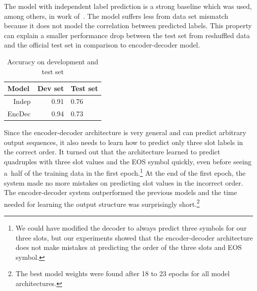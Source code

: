 \documentclass{itatnew}
\def\OD#1{{\color{darkgreen}OD: \it #1}}
\begin{document}
The model with independent label prediction is a strong baseline which was used, among others, in work of~\cite{zilka2015incremental}.
The model suffers less from data set mismatch because it does not model the correlation between predicted labels.
This property can explain a smaller performance drop between the test set from reshuffled data and the official test set in comparison to encoder-decoder model.

\begin{table}
\begin{center}
\begin{tabular}{r@{\quad}rll}
\hline
\multicolumn{1}{l}{\rule{0pt}{12pt}
                   Model}&\multicolumn{1}{l}{Dev set}&\multicolumn{2}{l}{Test set}\\[2pt]
\hline\rule{0pt}{12pt}
Indep  &   0.91 & 0.76 \\
EncDec &   0.94 & 0.73 \\
\hline
\end{tabular}
\caption{Accuracy on development and test set}
\vspace{-2em}
\end{center}
\label{tab:dstc}
\end{table}


Since the encoder-decoder architecture is very general and can predict arbitrary output sequences, it also needs to learn how to predict only three slot labels in the correct order.
It turned out that the architecture learned to predict quadruples with three slot values and the EOS symbol quickly, even before seeing a~half of the training data in the first epoch.\footnote{We could have modified the decoder to always predict three symbols for our three slots, but our experiments showed that the encoder-decoder architecture does not make mistakes at predicting the order of the three slots and EOS symbol.}  
At the end of the first epoch, the system made no more mistakes on predicting slot values in the incorrect order.
The encoder-decoder system 
outperformed the previous models and the time needed for learning the output structure was surprisingly short.\footnote{The best model weights were found after 18 to 23 epochs for all model architectures.}
\end{document}
